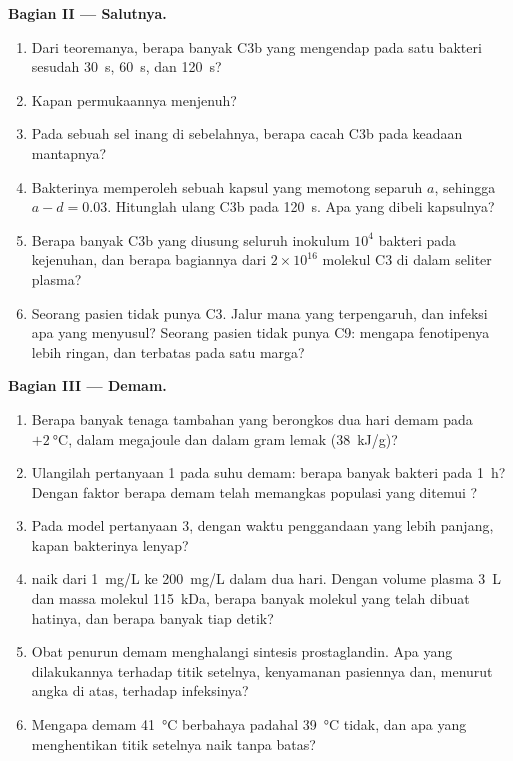 \begin{problem}
\medskip
\noindent\textbf{Bagian II --- Salutnya.}
\begin{enumerate}[resume]
  \item Dari teoremanya, berapa banyak C3b yang mengendap pada satu bakteri
        sesudah \qty{30}{s}, \qty{60}{s}, dan \qty{120}{s}?
  \item Kapan permukaannya menjenuh?
  \item Pada sebuah sel inang di sebelahnya, berapa cacah C3b pada keadaan
        mantapnya?
  \item Bakterinya memperoleh sebuah kapsul yang memotong separuh $a$, sehingga $a -
        d = 0.03$. Hitunglah ulang C3b pada \qty{120}{s}. Apa yang dibeli
        kapsulnya?
  \item Berapa banyak C3b yang diusung seluruh inokulum $10^{4}$ bakteri
        pada kejenuhan, dan berapa bagiannya dari
        $2\times 10^{16}$ molekul C3 di dalam seliter plasma?
  \item Seorang pasien tidak punya C3. Jalur mana yang terpengaruh, dan
        infeksi apa yang menyusul? Seorang pasien tidak punya C9: mengapa
        fenotipenya lebih ringan, dan terbatas pada satu marga?
\end{enumerate}

\medskip
\noindent\textbf{Bagian III --- Demam.}
\begin{enumerate}[resume]
  \item Berapa banyak tenaga tambahan yang berongkos dua hari demam pada
        $+\qty{2}{\celsius}$, dalam megajoule dan dalam gram lemak
        (\qty{38}{kJ/g})?
  \item Ulangilah pertanyaan 1 pada suhu demam: berapa banyak bakteri pada
        \qty{1}{h}? Dengan faktor berapa demam telah memangkas populasi yang
        ditemui ?
  \item Pada model pertanyaan 3, dengan waktu penggandaan yang lebih panjang,
        kapan bakterinya lenyap?
  \item {} naik dari \qty{1}{mg/L} ke \qty{200}{mg/L} dalam
        dua hari. Dengan volume plasma \qty{3}{L} dan massa
        molekul \qty{115}{kDa}, berapa banyak molekul yang telah dibuat hatinya,
        dan berapa banyak tiap detik?
  \item Obat penurun demam menghalangi sintesis prostaglandin. Apa yang
        dilakukannya terhadap titik setelnya, kenyamanan pasiennya dan, menurut
        angka di atas, terhadap infeksinya?
  \item Mengapa demam \qty{41}{\celsius} berbahaya padahal
        \qty{39}{\celsius} tidak, dan apa yang menghentikan titik setelnya naik
        tanpa batas?
\end{enumerate}


\end{problem}
